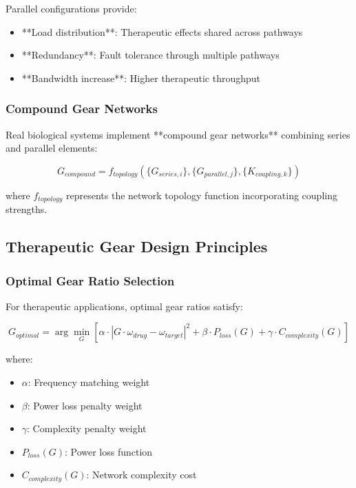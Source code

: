 \documentclass[12pt,a4paper]{article}
\begin{document}
Parallel configurations provide:
\begin{itemize}
\item **Load distribution**: Therapeutic effects shared across pathways
\item **Redundancy**: Fault tolerance through multiple pathways
\item **Bandwidth increase**: Higher therapeutic throughput
\end{itemize}

\subsubsection{Compound Gear Networks}

Real biological systems implement **compound gear networks** combining series and parallel elements:

\begin{equation}
G_{compound} = f_{topology}(\{G_{series,i}\}, \{G_{parallel,j}\}, \{K_{coupling,k}\})
\end{equation}

where $f_{topology}$ represents the network topology function incorporating coupling strengths.

\subsection{Therapeutic Gear Design Principles}

\subsubsection{Optimal Gear Ratio Selection}

For therapeutic applications, optimal gear ratios satisfy:

\begin{equation}
G_{optimal} = \arg\min_{G} \left[\alpha \cdot |G \cdot \omega_{drug} - \omega_{target}|^2 + \beta \cdot P_{loss}(G) + \gamma \cdot C_{complexity}(G)\right]
\end{equation}

where:
\begin{itemize}
\item $\alpha$: Frequency matching weight
\item $\beta$: Power loss penalty weight
\item $\gamma$: Complexity penalty weight
\item $P_{loss}(G)$: Power loss function
\item $C_{complexity}(G)$: Network complexity cost
\end{itemize}
\end{document}
